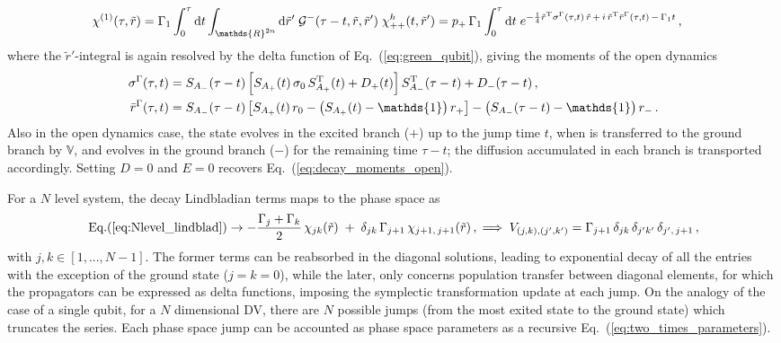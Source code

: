 \documentclass[%
reprint,
superscriptaddress,
nofootinbib,
 amsmath,amssymb,
prx,
floatfix,
]{revtex4-2}
\begin{document}
\begin{align}
    \chi^{(1)}(\tau, \tilde{r}) &= \Gamma_1 \int_0^\tau {\rm d}t \int_{\mathds{R}^{2n}} {\rm d}\tilde{r}'\; \mathcal{G}^{-}(\tau - t, \tilde{r}, \tilde{r}')\; \chi^{h}_{++}(t, \tilde{r}') 
    = p_+\, \Gamma_1 \int_0^\tau {\rm d}t\; e^{ -\frac{1}{4} \tilde{r}^{\rm T} \sigma^{\Gamma}(\tau, t)\, \tilde{r} \,+\, i\, \tilde{r}^{\rm T} \bar{r}^{\Gamma}(\tau, t) \,-\, \Gamma_1 t }\,,
\end{align}
where the $\tilde{r}'$-integral is again resolved by the delta function of Eq.~(\ref{eq:green_qubit}), giving the moments of the open dynamics
\begin{align}
\label{eq:decay_moments_open}
    \sigma^{\Gamma}(\tau, t) &= S_{A_-}(\tau - t) \left[ S_{A_+}(t)\, \sigma_0\, S^{\rm T}_{A_+}(t) + D_+(t) \right] S^{\rm T}_{A_-}(\tau - t) + D_-(\tau - t)\,, \nonumber \\
    \bar{r}^{\Gamma}(\tau, t) &= S_{A_-}(\tau - t) \left[ S_{A_+}(t)\, r_0 - \left( S_{A_+}(t) - \mathds{1} \right) r_+ \right] - \left( S_{A_-}(\tau - t) - \mathds{1} \right) r_-\,.
\end{align}
Also in the open dynamics case, the state evolves in the excited branch ($+$) up to the jump time $t$, when is transferred to the ground branch by $\mathds{V}$, and evolves in the ground branch ($-$) for the remaining time $\tau - t$; the diffusion accumulated in each branch is transported accordingly. Setting $D = 0$ and $E = 0$ recovers Eq.~(\ref{eq:decay_moments_open}). 

For a $N$ level system, the decay Lindbladian terms maps to the phase space as 
\begin{equation}
    \text{Eq.(\ref{eq:Nlevel_lindblad})} \rightarrow  -\frac{\Gamma_j + \Gamma_k}{2}\, \chi_{jk}(\tilde{r}) \;+\; \delta_{jk}\, \Gamma_{j+1}\, \chi_{j+1,\,j+1}(\tilde{r})\,, \implies  V_{(j,k),(j',k')} = \Gamma_{j+1}\, \delta_{jk}\, \delta_{j'k'}\, \delta_{j',\, j+1}\,,
\end{equation}
with $j,k\in[1,...,N-1]$. The former terms can be reabsorbed in the diagonal solutions, leading to exponential decay of all the entries with the exception of the ground state ($j=k=0$),  while the later, only concerns population transfer between diagonal elements, for which the propagators can be expressed as delta functions, imposing the symplectic transformation update at each jump. On the analogy of the case of a single qubit, for a $N$ dimensional DV, there are $N$ possible jumps (from the most exited state to the ground state) which truncates the series. Each phase space jump can be accounted as phase space parameters as a recursive Eq.~(\ref{eq:two_times_parameters}). 
\end{document}
